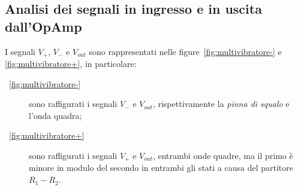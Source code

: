 \documentclass[10pt,a4paper]{article}
\begin{document}
\subsection{Analisi dei segnali in ingresso e in uscita dall'OpAmp}
I segnali $V_+$, $V_-$ e $V_{out}$ sono rappresentati nelle figure~\ref{fig:multivibratore-} e \ref{fig:multivibratore+}, in particolare:
\begin{description}
\item[\figurename{~\ref{fig:multivibratore-}}] sono raffigurati i segnali $V_-$ e $V_{out}$, rispettivamente la \emph{pinna di squalo} e l'onda quadra;
\item[\figurename{~\ref{fig:multivibratore+}}] sono raffigurati i segnali $V_+$ e $V_{out}$, entrambi onde quadre, ma il primo è minore in modulo del secondo in entrambi gli stati a causa del partitore $R_1-R_2$.
\end{description}
\end{document}
